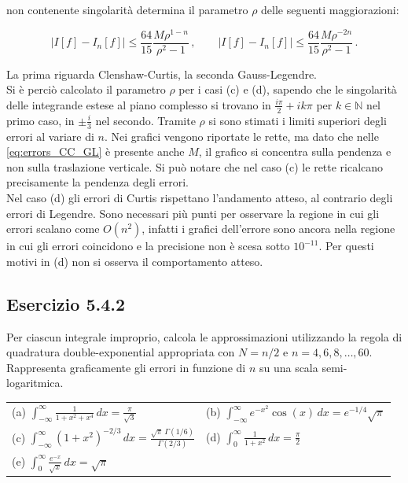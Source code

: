 \documentclass[letterpaper, 12pt]{article}
\numberwithin{equation}{section}    %
\begin{document}
non contenente singolarità 
determina il parametro $\rho$ delle seguenti maggiorazioni:

\begin{equation}
    \label{eq:errors_CC_GL}
    |I[f]-I_n[f]| \leq \frac{64}{15} \frac{M\rho^{1-n}}{\rho^2-1}\,, \qquad |I[f]-I_n[f]| \leq \frac{64}{15} \frac{M\rho^{-2n}}{\rho^2-1}\,.
    \end{equation}

La prima riguarda Clenshaw-Curtis, la seconda Gauss-Legendre.\\
Si è perciò calcolato il parametro $\rho$ per i casi (c) e (d), sapendo che le singolarità delle integrande estese
al piano complesso si trovano in $\frac{i \pi}{2} + ik\pi$ per $k \in \mathbb{N}$ nel primo caso, in $\pm \frac{i}{3}$
nel secondo. Tramite $\rho$ si sono stimati i limiti superiori degli errori al variare di $n$. Nei grafici 
vengono riportate le rette, ma dato che nelle \ref{eq:errors_CC_GL} è presente anche $M$, 
il grafico si concentra sulla pendenza e non sulla traslazione verticale. Si può notare che nel caso (c) 
le rette ricalcano precisamente la pendenza degli errori. \\ 
Nel caso (d) gli errori di Curtis rispettano l'andamento atteso, al contrario degli errori di Legendre. 
Sono necessari più punti per osservare la regione in cui gli errori scalano come $O(n^2)$, infatti i grafici 
dell'errore sono ancora nella regione in cui gli errori coincidono e la precisione non è scesa sotto $10^{-11}$.
Per questi motivi in (d) non si osserva il comportamento atteso.

\subsection{Esercizio 5.4.2}
Per ciascun integrale improprio, calcola le approssimazioni utilizzando la regola di quadratura double-exponential 
appropriata con $N=n/2$ e $n=4,6,8,\ldots,60$. Rappresenta graficamente gli errori in funzione di $n$ 
su una scala semi-logaritmica.

\begin{tabular}{@{}ll@{}}
(a) $\displaystyle\int_{-\infty}^\infty \frac{1}{1+x^2+x^4}\, dx = \frac{\pi}{\sqrt{3}}$
    & (b) $\displaystyle\int_{-\infty}^\infty e^{-x^2}\cos(x)\, dx = e^{-1/4}\sqrt{\pi}$ \\[1.5ex]
(c) $\displaystyle\int_{-\infty}^\infty (1+x^2)^{-2/3}\, dx = \frac{\sqrt{\pi}\,\Gamma(1/6)}{\Gamma(2/3)}$
    & (d) $\displaystyle \int_{0}^{\infty} \frac{1}{1+x^2}\,dx = \frac{\pi}{2}$ \\[1.5ex]
(e) $\displaystyle \int_0^\infty \frac{e^{-x}}{\sqrt{x}}\,dx = \sqrt{\pi}$ & \\
\end{tabular}
\end{document}
